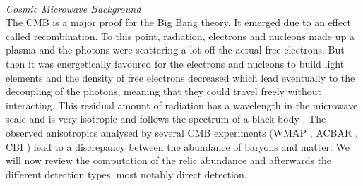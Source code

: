 \\ \textit{Cosmic Microwave Background}\\
\noindent The CMB is a major proof for the Big Bang theory. It emerged due to an effect called recombination. 
To this point, radiation, electrons and nucleons made up a plasma and the photons were scattering a lot off the actual free electrons. But then it was 
energetically favoured for the electrons and nucleons to build light elements and the density of free electrons decreased which lead eventually to the decoupling
of the photons, meaning that they could travel freely without interacting. This residual amount of radiation has a wavelength in the microwave scale and is
very isotropic and follows the spectrum of a black body \cite{DM-EvCaDo}. The observed anisotropics analysed by several CMB experiments 
(WMAP \cite{1212.5226}, ACBAR \cite{0303515}, CBI \cite{0205388}) lead to a discrepancy
between the abundance of baryons and matter. We will now review the computation of the relic abundance and afterwards the different detection types, most 
notably direct detection.
